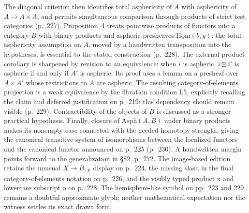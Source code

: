\documentclass[10pt,oneside]{book}
\begin{document}
The diagonal criterion then identifies total asphericity of $A$ with asphericity of $A\to A\times A$, and permits simultaneous comparison through products of strict test categories (p.\ 227). Proposition~4 treats pointwise products of functors into a category $B$ with binary products and aspheric presheaves $\underline{\mathrm{Hom}}(b,y)$: the total-asphericity assumption on $A$, moved by a handwritten transposition into the hypotheses, is essential to the stated construction (p.\ 228). The external-product corollary is sharpened by revision to an equivalence: when $i$ is aspheric, $i\boxtimes i'$ is aspheric if and only if $A'$ is aspheric. Its proof uses a lemma on a presheaf over $A\times A'$ whose restrictions to $A$ are aspheric. The resulting category-of-elements projection is a weak equivalence by the fibration condition L5, explicitly recalling the claim and deferred justification on p.\ 219; this dependency should remain visible (p.\ 229). Contractibility of the objects of $B$ is discussed as a stronger practical hypothesis. Finally, closure of $\mathrm{Asph}(A,B)$ under binary products makes its nonempty case connected with the needed homotopy strength, giving the canonical transitive system of isomorphisms between the localized functors and the canonical functor announced on p.\ 225 (p.\ 230). A handwritten margin points forward to the generalization in \S82, p.\ 272. The image-based edition retains the unusual $X\longrightarrow B_{/X}$ display on p.\ 224, the missing slash in the final category-of-elements notation on p.\ 226, and the visibly typed product x and lowercase subscript o on p.\ 228. The hemisphere-like symbol on pp.\ 223 and 229 remains a doubtful approximate glyph; neither mathematical expectation nor the witness settles its exact drawn form.
\end{document}
